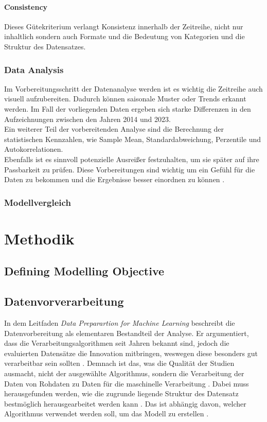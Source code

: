 \documentclass[12pt]{report}
\begin{document}
	\subsubsection{Consistency}
	Dieses Gütekriterium verlangt Konsistenz innerhalb der Zeitreihe, nicht nur inhaltlich sondern auch Formate und die Bedeutung von Kategorien und die Struktur des Datensatzes.
	
	\subsection{Data Analysis}
	Im Vorbereitungsschritt der Datenanalyse werden ist es wichtig die Zeitreihe auch visuell aufzubereiten. Dadurch können saisonale Muster oder Trends erkannt werden\cite[14f.]{Montgomery.2015}. 
	Im Fall der vorliegenden Daten ergeben  sich starke Differenzen in den Aufzeichnungen zwischen den Jahren 2014 und 2023.\\
	Ein weiterer Teil der vorbereitenden Analyse sind die Berechnung der statistischen Kennzahlen, wie Sample Mean, Standardabweichung, Perzentile und Autokorrelationen.\\ %
	Ebenfalls ist es sinnvoll potenzielle Ausreißer festzuhalten, um sie später auf ihre Passbarkeit zu prüfen. Diese Vorbereitungen sind wichtig um ein Gefühl für die Daten zu bekommen und die Ergebnisse besser einordnen zu können \cite[15]{Montgomery.2015}.\\
	\subsection{Modellvergleich}
	
	\chapter{Methodik} %
	\section{Defining Modelling Objective}
	\section{Datenvorverarbeitung}
	In dem Leitfaden \textit{Data Preparartion for Machine Learning} beschreibt \cite{Brownlee.2020} die Datenvorbereitung als elementaren Bestandteil der Analyse. Er argumentiert, dass die Verarbeitungsalgorithmen seit Jahren bekannt sind, jedoch die evaluierten Datensätze die Innovation mitbringen, weswegen diese besonders gut verarbeitbar sein sollten \cite[14]{Brownlee.2020}. Demnach ist das,  was die Qualität der Studien ausmacht, nicht der ausgewählte Algorithmus, sondern die Verarbeitung der Daten von Rohdaten zu Daten für die maschinelle Verarbeitung \cite[9]{Brownlee.2020}. Dabei muss herausgefunden werden, wie die zugrunde liegende Struktur des Datensatz bestmöglich herausgearbeitet werden kann \cite[8]{Brownlee.2020}. Das ist abhängig davon, welcher Algorithmus verwendet werden soll, um das Modell zu erstellen \cite[12]{Brownlee.2020}. 
\end{document}
